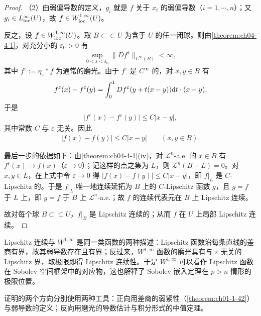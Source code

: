 \documentclass[../../main.tex]{subfiles}%
\begin{document}
\begin{proof}
（2）由弱偏导数的定义，$g_i$ 就是 $f$ 关于 $x_i$ 的弱偏导数（$i=1,\cdots,n$）；又 $g_i\in L^\infty_{\mathrm{loc}}(U)$，故 $f\in W^{1,\infty}_{\mathrm{loc}}(U)$。

反之，设 $f\in W^{1,\infty}_{\mathrm{loc}}(U)$。取 $B\subset\subset U$ 为含于 $U$ 的任一闭球。则由\cref{theorem:ch04-4-1}，对充分小的 $\varepsilon_0>0$ 有%
\begin{align*}
\sup_{0<\varepsilon<\varepsilon_0}\lVert Df^\varepsilon\rVert_{L^\infty(B)}<\infty,
\end{align*}
其中 $f^\varepsilon:=\eta_\varepsilon*f$ 为通常的磨光。由于 $f^\varepsilon$ 是 $C^\infty$ 的，对 $x,y\in B$ 有
\begin{align*}
f^\varepsilon(x)-f^\varepsilon(y)=\int_0^1Df^\varepsilon(y+t(x-y))\mathrm{d} t\cdot(x-y),
\end{align*}
于是
\begin{align*}
\lvert f^\varepsilon(x)-f^\varepsilon(y)\rvert\leqslant C\lvert x-y\rvert,
\end{align*}
其中常数 $C$ 与 $\varepsilon$ 无关。因此
\begin{align*}
\lvert f(x)-f(y)\rvert\leqslant C\lvert x-y\rvert\qquad(x,y\in B).
\end{align*}

最后一步的依据如下：由\cref{theorem:ch04-4-1}(iv)，对 $\mathcal{L}^n$-a.e. 的 $x\in B$ 有 $f^\varepsilon(x)\to f(x)$（$\varepsilon\to0$）；记这样的点之集为 $L$，则 $\mathcal{L}^n(B-L)=0$。对 $x,y\in L$，在上式中令 $\varepsilon\to0$ 得 $\lvert f(x)-f(y)\rvert\leqslant C\lvert x-y\rvert$，即 $f|_L$ 是 $C$-Lipschitz 的。于是 $f|_L$ 唯一地连续延拓为 $B$ 上的 $C$-Lipschitz 函数 $g$，且 $g=f$ 于 $L$ 上，即 $g=f$ 于 $B$ 上 $\mathcal{L}^n$-a.e.；故 $f$ 的连续代表元在 $B$ 上 Lipschitz 连续。%

故对每个球 $B\subset\subset U$，$f|_B$ 是 Lipschitz 连续的；从而 $f$ 在 $U$ 上局部 Lipschitz 连续。
\end{proof}

\begin{remark}\label{remark:ch04-thm-4-5-动机}
Lipschitz 连续与 $W^{1,\infty}$ 是同一类函数的两种描述：Lipschitz 函数沿每条直线的差商有界，故其弱导数存在且有界；反过来，$W^{1,\infty}$ 函数的磨光具有与 $\varepsilon$ 无关的 Lipschitz 界，取极限即得 Lipschitz 连续性。于是 $W^{1,\infty}$ 可以看作 Lipschitz 函数在 Sobolev 空间框架中的对应物，这也解释了 Sobolev 嵌入定理在 $p>n$ 情形的极限位置。

证明的两个方向分别使用两种工具：正向用差商的弱紧性（\cref{theorem:ch01-1-42}）与弱导数的定义；反向用磨光的导数估计与积分形式的中值定理。%
\end{remark}
\end{document}
